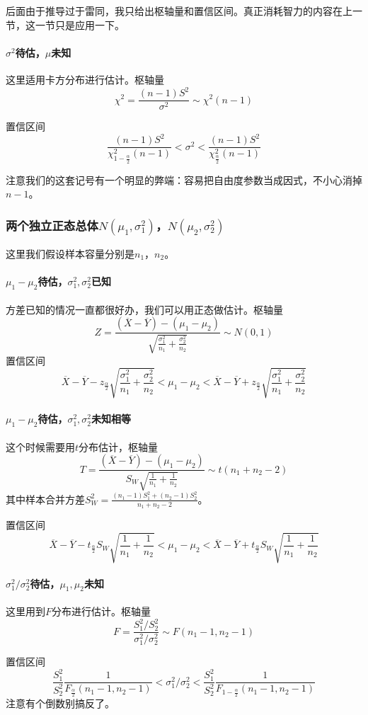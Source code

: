 后面由于推导过于雷同，我只给出枢轴量和置信区间。真正消耗智力的内容在上一节，这一节只是应用一下。

\paragraph{$\sigma^2$待估，$\mu$未知}

这里适用卡方分布进行估计。枢轴量
\[
\chi^2 = \frac{(n-1)S^2}{\sigma^2}\sim \chi^2(n-1)
\]

置信区间
\[
\frac{(n-1)S^2}{\chi^2_{1-\frac{\alpha}{2}}(n-1)}<\sigma^2<\frac{(n-1)S^2}{\chi^2_{\frac{\alpha}{2}}(n-1)}
\]

注意我们的这套记号有一个明显的弊端：容易把自由度参数当成因式，不小心消掉$n-1$。

\subsubsection{两个独立正态总体$N(\mu_1,\sigma_1^2)$，$N(\mu_2,\sigma_2^2)$}
这里我们假设样本容量分别是$n_1$，$n_2$。

\paragraph{$\mu_1-\mu_2$待估，$\sigma_1^2,\sigma_2^2$已知}

方差已知的情况一直都很好办，我们可以用正态做估计。枢轴量
\[
Z=\frac{(\overline{X}-\overline{Y})-(\mu_1-\mu_2)}{\sqrt{\frac{\sigma_1^2}{n_1}+\frac{\sigma_2^2}{n_2}}} \sim N(0,1)
\]
置信区间
\[
\overline{X}-\overline{Y}-z_{\frac{\alpha}{2}}\sqrt{\frac{\sigma_1^2}{n_1}+\frac{\sigma_2^2}{n_2}}<\mu_1-\mu_2<\overline{X}-\overline{Y}+z_{\frac{\alpha}{2}}\sqrt{\frac{\sigma_1^2}{n_1}+\frac{\sigma_2^2}{n_2}}
\]

\paragraph{$\mu_1-\mu_2$待估，$\sigma_1^2,\sigma_2^2$未知相等}

这个时候需要用$t$分布估计，枢轴量
\[
T=\frac{(\overline{X}-\overline{Y})-(\mu_1-\mu_2)}{S_W\sqrt{\frac{1}{n_1}+\frac{1}{n_2}}} \sim t(n_1+n_2-2)
\]
其中样本合并方差$S_W^2=\frac{(n_1-1)S_1^2+(n_2-1)S^2_2}{n_1+n_2-2}$。

置信区间
\[
\overline{X}-\overline{Y}-t_{\frac{\alpha}{2}}S_W\sqrt{\frac{1}{n_1}+\frac{1}{n_2}}<\mu_1-\mu_2<\overline{X}-\overline{Y}+t_{\frac{\alpha}{2}}S_W\sqrt{\frac{1}{n_1}+\frac{1}{n_2}}
\]

\paragraph{$\sigma^2_1/\sigma^2_2$待估，$\mu_1,\mu_2$未知}
这里用到$F$分布进行估计。枢轴量
\[
F=\frac{S_1^2/S_2^2}{\sigma_1^2/\sigma_2^2} \sim F(n_1-1,n_2-1)
\]

置信区间
\[
\frac{S_1^2}{S_2^2} \frac{1}{F_{\frac{\alpha}{2}}(n_1-1,n_2-1)}<\sigma^2_1/\sigma^2_2<\frac{S_1^2}{S_2^2} \frac{1}{F_{1-\frac{\alpha}{2}}(n_1-1,n_2-1)}
\]
注意有个倒数别搞反了。
